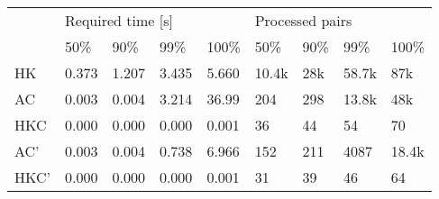 \begin{tabular}{l|llll|llll}
\multirow{2}{*}{} & \multicolumn{4}{l|}{Required time {[}s{]}} & \multicolumn{4}{l}{Processed pairs} \\ \cline{2-9}
                  & 50\%     & 90\%      & 99\%     & 100\%    & 50\%    & 90\%   & 99\%    & 100\%  \\ \hline
HK                & 0.373    & 1.207     & 3.435    & 5.660    & 10.4k   & 28k    & 58.7k   & 87k    \\
AC                & 0.003    & 0.004     & 3.214    & 36.99    & 204     & 298    & 13.8k   & 48k    \\
HKC               & 0.000    & 0.000     & 0.000    & 0.001    & 36      & 44     & 54      & 70     \\
AC'               & 0.003    & 0.004     & 0.738    & 6.966    & 152     & 211    & 4087    & 18.4k  \\
HKC'              & 0.000    & 0.000     & 0.000    & 0.001    & 31      & 39     & 46      & 64
\end{tabular}
